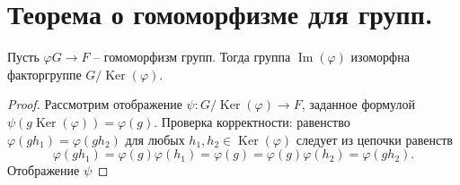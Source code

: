 \section{Теорема о гомоморфизме для групп.}

\begin{theorem}
    Пусть $\varphi G \to F$ -- гомоморфизм групп. Тогда группа $\operatorname{Im}(\varphi)$ изоморфна факторгруппе $G / \operatorname{Ker}(\varphi)$.
    \begin{proof}
        Рассмотрим отображение $\psi : G / \operatorname{Ker}(\varphi) \to F$, заданное формулой $\psi(g \operatorname{Ker}(\varphi)) = \varphi(g)$.
        Проверка корректности: равенство $\varphi(gh_1) = \varphi(gh_2)$ для любых $h_1, h_2 \in \operatorname{Ker}(\varphi)$ следует из цепочки равенств
        \[
            \varphi(gh_1) = \varphi(g)\varphi(h_1) = \varphi(g) = \varphi(g)\varphi(h_2) = \varphi(gh_2).
        \]
        Отображение $\psi$
    \end{proof}
\end{theorem}
